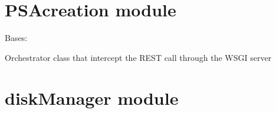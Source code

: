 \documentclass[letterpaper,10pt,oneside]{sphinxmanual}
\begin{document}
\chapter{PSAcreation module}
\label{PSAcreation:module-PSAcreation}\label{PSAcreation::doc}\label{PSAcreation:psacreation-module}

\begin{fulllineitems}
\label{PSAcreation:PSAcreation.PSAcreation}
Bases: 

Orchestrator class that intercept the REST call through the WSGI server

\begin{fulllineitems}
\label{PSAcreation:PSAcreation.PSAcreation.get_client_address}
\end{fulllineitems}


\begin{fulllineitems}
\label{PSAcreation:PSAcreation.PSAcreation.on_delete}
\end{fulllineitems}


\begin{fulllineitems}
\label{PSAcreation:PSAcreation.PSAcreation.on_get}
\end{fulllineitems}


\begin{fulllineitems}
\label{PSAcreation:PSAcreation.PSAcreation.on_put}
\end{fulllineitems}


\end{fulllineitems}



\chapter{diskManager module}
\label{diskManager::doc}\label{diskManager:module-diskManager}\label{diskManager:diskmanager-module}
\end{document}
